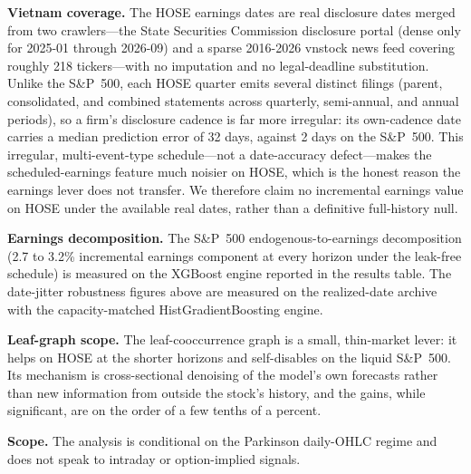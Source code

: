 \documentclass[runningheads]{llncs}
\begin{document}
\noindent\textbf{Vietnam coverage.} The HOSE earnings dates are real disclosure dates merged from two
crawlers---the State Securities Commission disclosure portal (dense only for 2025-01 through 2026-09) and
a sparse 2016-2026 vnstock news feed covering roughly 218 tickers---with no imputation and no
legal-deadline substitution. Unlike the S\&P~500, each HOSE quarter emits several distinct filings
(parent, consolidated, and combined statements across quarterly, semi-annual, and annual periods), so a
firm's disclosure cadence is far more irregular: its own-cadence date carries a median prediction error of
32 days, against 2 days on the S\&P~500. This irregular, multi-event-type schedule---not a date-accuracy
defect---makes the scheduled-earnings feature much noisier on HOSE, which is the honest reason the earnings
lever does not transfer. We therefore claim no incremental earnings value on HOSE under the available real
dates, rather than a definitive full-history null.

\noindent\textbf{Earnings decomposition.} The S\&P~500 endogenous-to-earnings decomposition (2.7 to
3.2\% incremental earnings component at every horizon under the leak-free schedule) is measured on the
XGBoost engine reported in the results table. The date-jitter robustness figures above are measured on
the realized-date archive with the capacity-matched HistGradientBoosting engine.

\noindent\textbf{Leaf-graph scope.} The leaf-cooccurrence graph is a small, thin-market lever: it helps
on HOSE at the shorter horizons and self-disables on the liquid S\&P~500. Its mechanism is
cross-sectional denoising of the model's own forecasts rather than new information from outside the
stock's history, and the gains, while significant, are on the order of a few tenths of a percent.

\noindent\textbf{Scope.} The analysis is conditional on the Parkinson daily-OHLC regime and does not
speak to intraday or option-implied signals.
\end{document}
